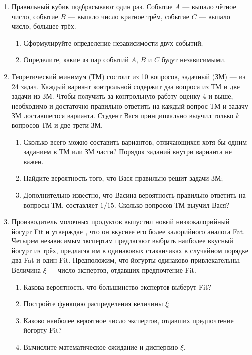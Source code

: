 \begin{enumerate}

\item Правильный кубик подбрасывают один раз. Событие $A$ — выпало чётное число, событие $B$ — выпало число кратное трём, событие $C$ — выпало число, большее трёх.

\begin{enumerate}
\item Сформулируйте определение независимости двух событий;
\item Определите, какие из пар событий $A$, $B$ и $C$ будут независимыми.
\end{enumerate}


\item Теоретический минимум (ТМ) состоит из 10 вопросов, задачный (ЗМ) — из 24 задач.
Каждый вариант контрольной содержит два вопроса из ТМ и две задачи из ЗМ.
Чтобы получить за контрольную работу оценку 4 и выше, необходимо и достаточно правильно ответить на каждый вопрос ТМ и задачу ЗМ доставшегося варианта. Студент Вася принципиально выучил только $k$ вопросов ТМ и две трети ЗМ.
\begin{enumerate}
\item Сколько всего можно составить вариантов, отличающихся хотя бы одним заданием в ТМ или ЗМ части? Порядок заданий внутри варианта не важен.
\item Найдите вероятность того, что Вася правильно решит задачи ЗМ;
\item Дополнительно известно, что Васина вероятность правильно ответить на вопросы ТМ, составляет $1/15$. Сколько вопросов ТМ выучил Вася?
\end{enumerate}

\newpage

\item Производитель молочных продуктов выпустил новый низкокалорийный йогурт Fit и утверждает, что он вкуснее его более калорийного аналога Fat.
Четырем независимым экспертам предлагают выбрать наиболее вкусный йогурт из трёх, предлагая им в одинаковых стаканчиках в случайном порядке два Fat и один Fit.
Предположим, что йогурты одинаково привлекательны.
Величина $\xi$ — число экспертов, отдавших предпочтение Fit.
\begin{enumerate}
\item Какова вероятность, что большинство экспертов выберут Fit?
\item Постройте функцию распределения величины $\xi$;
\item Каково наиболее вероятное число экспертов, отдавших предпочтение йогорту Fit?
\item Вычислите математическое ожидание и дисперсию $\xi$.
\end{enumerate}


\end{enumerate}
